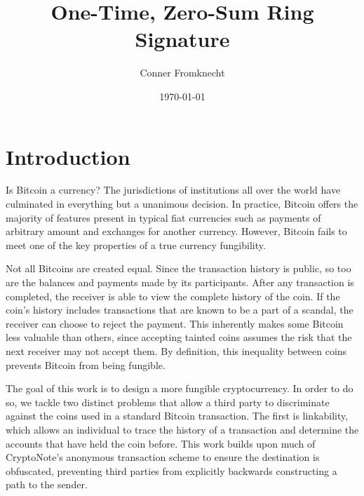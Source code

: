 \documentclass{article}
\begin{document}
\title{One-Time, Zero-Sum Ring Signature}

\author{Conner Fromknecht}
\date{\today}

\maketitle

\section{Introduction}
  
Is Bitcoin a currency?  The jurisdictions of institutions all over the world
have culminated in everything but a unanimous decision.  In practice, Bitcoin
offers the majority of features present in typical fiat currencies such as
payments of arbitrary amount and exchanges for another currency.  However,
Bitcoin fails to meet one of the key properties of a true currency\textemdash
fungibility.

Not all Bitcoins are created equal.  Since the transaction history is public, so
too are the balances and payments made by its participants.  After any
transaction is completed, the receiver is able to view the complete history of
the coin. If the coin's history includes transactions that are known to be a
part of a scandal, the receiver can choose to reject the payment.  This
inherently makes some Bitcoin less valuable than others, since accepting tainted
coins assumes the risk that the next receiver may not accept them.  By
definition, this inequality between coins prevents Bitcoin from being fungible.

The goal of this work is to design a more fungible cryptocurrency.  In order to
do so, we tackle two distinct problems that allow a third party to discriminate
against the coins used in a standard Bitcoin transaction.  The first is
linkability, which allows an individual to trace the history of a transaction
and determine the accounts that have held the coin before.  This work builds
upon  much of CryptoNote's \cite{S13} anonymous transaction scheme to ensure
the destination is obfuscated, preventing third parties from explicitly
backwards constructing a path to the sender.  
\end{document}
